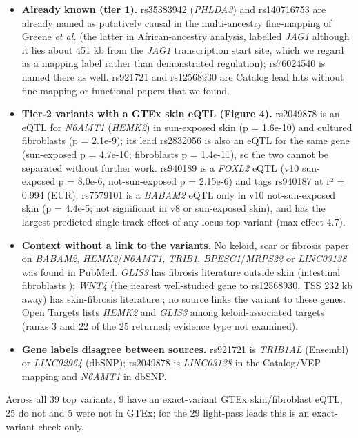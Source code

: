 \documentclass[10pt,twocolumn,a4paper]{article}
\providecommand{\tightlist}{}
\begin{document}
\begin{itemize}
\tightlist
\item
  \textbf{Already known (tier 1).} rs35383942 (\emph{PHLDA3}) and rs140716753 are already named as putatively causal in the multi-ancestry fine-mapping of Greene \emph{et al.} \cite{k1} (the latter in African-ancestry analysis, labelled \emph{JAG1} although it lies about 451 kb from the \emph{JAG1} transcription start site, which we regard as a mapping label rather than demonstrated regulation); rs76024540 is named there as well. rs921721 and rs12568930 are Catalog lead hits without fine-mapping or functional papers that we found.
\item
  \textbf{Tier-2 variants with a GTEx skin eQTL (Figure 4).} rs2049878 is an eQTL for \emph{N6AMT1} (\emph{HEMK2}) in sun-exposed skin (p = 1.6e-10) and cultured fibroblasts (p = 2.1e-9); its lead rs2832056 is also an eQTL for the same gene (sun-exposed p = 4.7e-10; fibroblasts p = 1.4e-11), so the two cannot be separated without further work. rs940189 is a \emph{FOXL2} eQTL (v10 sun-exposed p = 8.0e-6, not-sun-exposed p = 2.15e-6) and tags rs940187 \cite{k2,k4} at r² = 0.994 (EUR). rs7579101 is a \emph{BABAM2} eQTL only in v10 not-sun-exposed skin (p = 4.4e-5; not significant in v8 or sun-exposed skin), and has the largest predicted single-track effect of any locus top variant (max \textbar effect\textbar{} 4.7).
\item
  \textbf{Context without a link to the variants.} No keloid, scar or fibrosis paper on \emph{BABAM2}, \emph{HEMK2}/\emph{N6AMT1}, \emph{TRIB1}, \emph{BPESC1}/\emph{MRPS22} or \emph{LINC03138} was found in PubMed. \emph{GLIS3} has fibrosis literature outside skin (intestinal fibroblasts \cite{k7}); \emph{WNT4} (the nearest well-studied gene to rs12568930, TSS 232 kb away) has skin-fibrosis literature \cite{k11,k12}; no source links the variant to these genes. Open Targets lists \emph{HEMK2} and \emph{GLIS3} among keloid-associated targets (ranks 3 and 22 of the 25 returned; evidence type not examined).
\item
  \textbf{Gene labels disagree between sources.} rs921721 is \emph{TRIB1AL} (Ensembl) or \emph{LINC02964} (dbSNP); rs2049878 is \emph{LINC03138} in the Catalog/VEP mapping and \emph{N6AMT1} in dbSNP.
\end{itemize}

Across all 39 top variants, 9 have an exact-variant GTEx skin/fibroblast eQTL, 25 do not and 5 were not in GTEx; for the 29 light-pass leads this is an exact-variant check only.
\end{document}
